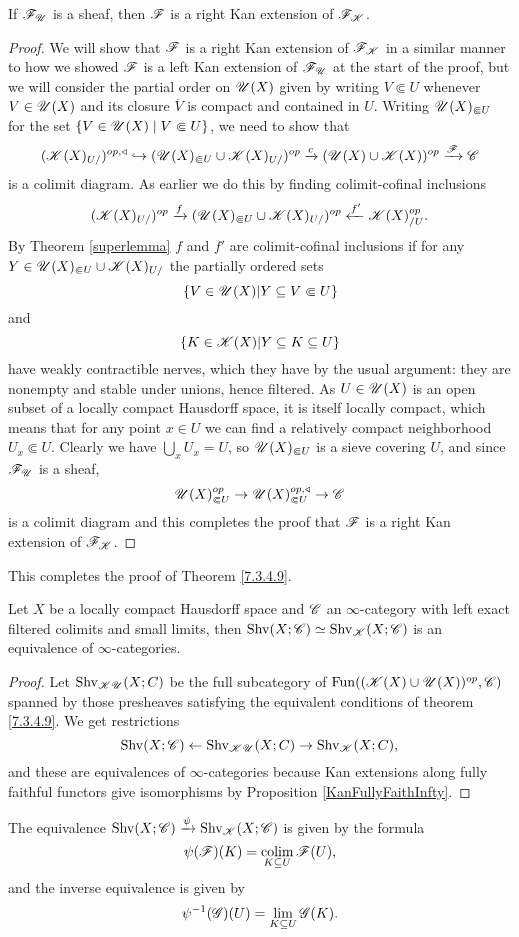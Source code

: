 \documentclass[../../thesis.tex]{subfiles}
\begin{document}
\begin{lemma}
    If $\mathscr{F}_{\mathscr{U}}$ is a sheaf, then $\mathscr{F}$ is a right Kan extension of $\mathscr{F}_{\mathscr{K}}$.
\end{lemma}
\begin{proof}
    We will show that $\mathscr{F}$ is a right Kan extension of $\mathscr{F}_{\mathscr{K}}$ in a similar manner to how we showed $\mathscr{F}$ is a left Kan extension of $\mathscr{F}_{\mathscr{U}}$ at the start of the proof, but we will consider the partial order on $\mathscr{U}(X)$ given by writing $V\Subset U$ whenever $V\in \mathscr{U}(X)$ and its closure $\overline{V}$ is compact and contained in $U$.
    Writing $\mathscr{U}(X)_{\Subset U}$ for the set $\{V\in \mathscr{U}(X) \mid V\Subset U\}$, we need to show that
    \[
        (\mathscr{K}(X)_{U/})^{op,\triangleleft} \hookrightarrow (\mathscr{U}(X)_{\Subset U} \cup \mathscr{K}(X)_{U/})^{op} \xrightarrow{c}(\mathscr{U}(X) \cup \mathscr{K}(X))^{op} \xrightarrow{\mathscr{F}} \mathscr{C}
    \]
    is a colimit diagram.
    As earlier we do this by finding colimit-cofinal inclusions
    \[
        (\mathscr{K}(X)_{U/})^{op} \xrightarrow{f}(\mathscr{U}(X)_{\Subset U} \cup \mathscr{K}(X)_{U/})^{op} \xleftarrow{f'} \mathscr{K}(X)_{/U}^{op}.
    \]
    By Theorem \ref{superlemma} $f$ and $f'$ are colimit-cofinal inclusions if for any $Y\in \mathscr{U}(X)_{\Subset U} \cup \mathscr{K}(X)_{U/}$ the partially ordered sets
    \[
        \{ V \in \mathscr{U}(X) |Y \subseteq V \Subset U \}
    \]
    and
    \[
        \{ K \in \mathscr{K}(X) |Y \subseteq K \subseteq U \}
    \]
    have weakly contractible nerves, which they have by the usual argument: they are nonempty and stable under unions, hence filtered.
    As $U\in \mathscr{U}(X)$ is an open subset of a locally compact Hausdorff space, it is itself locally compact, which means that for any point $x \in U$ we can find a relatively compact neighborhood $U_x \Subset U$.
    Clearly we have $\bigcup_x U_x = U$, so $\mathscr{U}(X)_{\Subset U}$ is a sieve covering $U$, and since $\mathscr{F}_{\mathscr{U}}$ is a sheaf,
    \[
        \mathscr{U}(X)_{\Subset U}^{op} \to \mathscr{U}(X)_{\Subset U}^{op, \triangleleft} \to \mathscr{C}
    \]
    is a colimit diagram and this completes the proof that $\mathscr{F}$ is a right Kan extension of $\mathscr{F}_{\mathscr{K}}$.
\end{proof}
This completes the proof of Theorem \ref{7.3.4.9}.
\begin{corollary}\label{7.3.4.10}
    Let $X$ be a locally compact Hausdorff space and $\mathscr{C}$ an $\infty$-category with left exact filtered colimits and small limits, then $\mathrm{Shv}(X;\mathscr{C}) \simeq \mathrm{Shv}_{\mathscr{K}}(X;\mathscr{C})$ is an equivalence of $\infty$-categories.
\end{corollary}
\begin{proof}
    Let $\mathrm{Shv}_{\mathscr{K}\mathscr{U}}(X;C)$ be the full subcategory of $\mathrm{Fun}((\mathscr{K}(X)\cup \mathscr{U}(X))^{op},\mathscr{C})$ spanned by those presheaves satisfying the equivalent conditions of theorem \ref{7.3.4.9}. We get restrictions
    \[
        \mathrm{Shv}(X;\mathscr{C}) \leftarrow \mathrm{Shv}_{\mathscr{K}\mathscr{U}}(X;C) \rightarrow \mathrm{Shv}_{\mathscr{K}}(X;C),
    \]
    and these are equivalences of $\infty$-categories because Kan extensions along fully faithful functors give isomorphisms by Proposition \ref{KanFullyFaithInfty}.
\end{proof}
\begin{remark}
    The equivalence $\mathrm{Shv}(X;\mathscr{C})\xrightarrow{\psi}\mathrm{Shv}_{\mathscr{K}}(X;\mathscr{C})$ is given by the formula
    \[
        \psi(\mathscr{F})(K) = \operatorname*{colim}_{K\subseteq U}\mathscr{F}(U),
    \]
    and the inverse equivalence is given by
    \[
        \psi^{-1}(\mathscr{G})(U) = \lim_{K\subseteq U}\mathscr{G}(K).
    \]
\end{remark}
\end{document}
